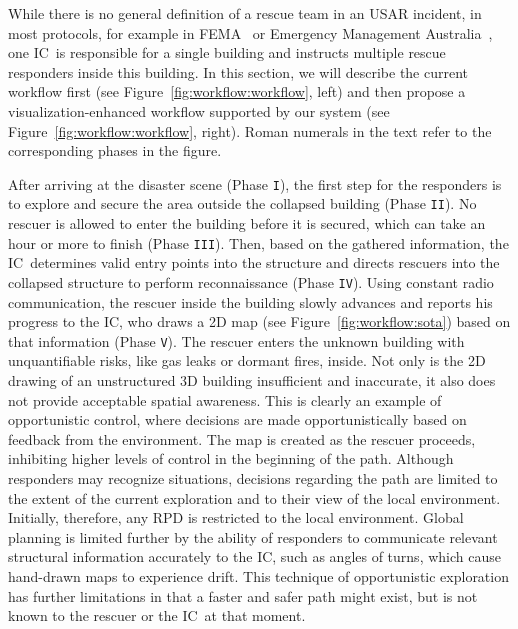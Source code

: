 \documentclass[review,journal]{vgtc}         %
\def\IC{IC}
\begin{document}
While there is no general definition of a rescue team in an USAR incident, in most protocols, for example in FEMA~\cite{fema08} or Emergency Management Australia~\cite{em35}, one \IC\ is responsible for a single building and instructs multiple rescue responders inside this building. In this section, we will describe the current workflow first (see Figure~\ref{fig:workflow:workflow}, left) and then propose a visualization-enhanced workflow supported by our system (see Figure~\ref{fig:workflow:workflow}, right). Roman numerals in the text refer to the corresponding phases in the figure.

 After arriving at the disaster scene (Phase \texttt{I}), the first step for the responders is to explore and secure the area outside the collapsed building (Phase \texttt{II}). No rescuer is allowed to enter the building before it is secured, which can take an hour or more to finish (Phase \texttt{III}). Then, based on the gathered information, the \IC\ determines valid entry points into the structure and directs rescuers into the collapsed structure to perform reconnaissance (Phase \texttt{IV}). Using constant radio communication, the rescuer inside the building slowly advances and reports his progress to the \IC, who draws a 2D map (see Figure~\ref{fig:workflow:sota}) based on that information (Phase \texttt{V}). The rescuer enters the unknown building with unquantifiable risks, like gas leaks or dormant fires, inside. Not only is the 2D drawing of an unstructured 3D building insufficient and inaccurate, it also does not provide acceptable spatial awareness. This is clearly an example of opportunistic control, where decisions are made opportunistically based on feedback from the environment. The map is created as the rescuer proceeds, inhibiting higher levels of control in the beginning of the path. Although responders may recognize situations, decisions regarding the path are limited to the extent of the current exploration and to their view of the local environment. Initially, therefore, any RPD is restricted to the local environment. Global planning is limited further by the ability of responders to communicate relevant structural information accurately to the \IC, such as angles of turns, which cause hand-drawn maps to experience drift. This technique of opportunistic exploration has further limitations in that a faster and safer path might exist, but is not known to the rescuer or the \IC\ at that moment.
\end{document}
